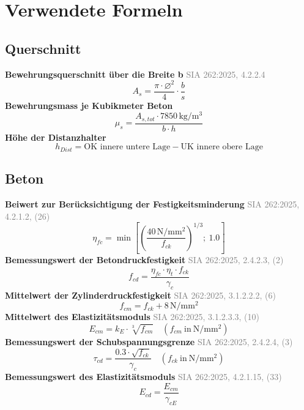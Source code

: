 \documentclass[11pt,a4paper]{article}
\newcommand{\normref}[1]{{\small\textcolor{gray}{#1}}}
\begin{document}
\section{Verwendete Formeln}
\subsection{Querschnitt}
\noindent\textbf{Bewehrungsquerschnitt über die Breite b} \hfill \normref{SIA 262:2025, 4.2.2.4}
\begin{equation*}
A_s = \frac{\pi \cdot \varnothing^{2}}{4} \cdot \frac{b}{s}
\end{equation*}
\noindent\textbf{Bewehrungsmass je Kubikmeter Beton}
\begin{equation*}
\mu_s = \frac{A_{s,tot} \cdot 7850\,\mathrm{kg}/\mathrm{m}^{3}}{b \cdot h}
\end{equation*}
\noindent\textbf{Höhe der Distanzhalter}
\begin{equation*}
h_{Dist} = \text{OK innere untere Lage} - \text{UK innere obere Lage}
\end{equation*}
\subsection{Beton}
\noindent\textbf{Beiwert zur Berücksichtigung der Festigkeitsminderung} \hfill \normref{SIA 262:2025, 4.2.1.2, (26)}
\begin{equation*}
\eta_{fc} = \min\left[\left(\frac{40\,\mathrm{N}/\mathrm{mm}^{2}}{f_{ck}}\right)^{1/3};\ 1.0\right]
\end{equation*}
\noindent\textbf{Bemessungswert der Betondruckfestigkeit} \hfill \normref{SIA 262:2025, 2.4.2.3, (2)}
\begin{equation*}
f_{cd} = \frac{\eta_{fc} \cdot \eta_t \cdot f_{ck}}{\gamma_c}
\end{equation*}
\noindent\textbf{Mittelwert der Zylinderdruckfestigkeit} \hfill \normref{SIA 262:2025, 3.1.2.2.2, (6)}
\begin{equation*}
f_{cm} = f_{ck} + 8\,\mathrm{N}/\mathrm{mm}^{2}
\end{equation*}
\noindent\textbf{Mittelwert des Elastizitätsmoduls} \hfill \normref{SIA 262:2025, 3.1.2.3.3, (10)}
\begin{equation*}
E_{cm} = k_E \cdot \sqrt[3]{f_{cm}} \quad \left(f_{cm}\ \text{in}\ \mathrm{N}/\mathrm{mm}^{2}\right)
\end{equation*}
\noindent\textbf{Bemessungswert der Schubspannungsgrenze} \hfill \normref{SIA 262:2025, 2.4.2.4, (3)}
\begin{equation*}
\tau_{cd} = \frac{0.3 \cdot \sqrt{f_{ck}}}{\gamma_c} \quad \left(f_{ck}\ \text{in}\ \mathrm{N}/\mathrm{mm}^{2}\right)
\end{equation*}
\noindent\textbf{Bemessungswert des Elastizitätsmoduls} \hfill \normref{SIA 262:2025, 4.2.1.15, (33)}
\begin{equation*}
E_{cd} = \frac{E_{cm}}{\gamma_{cE}}
\end{equation*}
\end{document}
